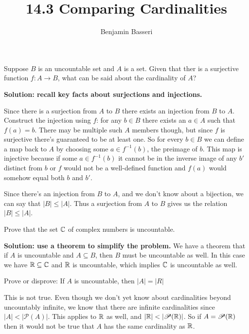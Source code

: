 \documentclass{article}
\title{14.3 Comparing Cardinalities}
\author{Benjamin Basseri}
\begin{document}
\maketitle

\begin{problem}
Suppose $B$ is an uncountable set and $A$ is a set. Given that ther is a surjective function $f: A \to B$, what can be said about the cardinality of $A$?
\end{problem}

\textbf{Solution: recall key facts about surjections and injections.}

Since there is a surjection from $A$ to $B$ there exists an injection from $B$ to $A$. Construct the injection using $f$: for any $b \in B$ there exists an $a \in A$ such that $f(a) = b$. There may be multiple such $A$ members though, but since $f$ is surjective there's guaranteed to be at least one. So for every $b \in B$ we can define a map back to $A$ by choosing some $a \in f^{-1}(b)$, the preimage of $b$. This map is injective because if some $a \in f^{-1}(b)$ it cannot be in the inverse image of any $b'$ distinct from $b$ or $f$ would not be a well-defined function and $f(a)$ would somehow equal both $b$ and $b'$.

Since there's an injection from $B$ to $A$, and we don't know about a bijection, we can say that $|B| \leq |A|$. Thus a surjection from $A$ to $B$ gives us the relation $|B| \leq |A|$.

\begin{problem}
Prove that the set $\mathbb{C}$ of complex numbers is uncountable.
\end{problem}

\textbf{Solution: use a theorem to simplify the problem.} We have a theorem that if $A$ is uncountable and $A \subseteq B$, then $B$ must be uncountable as well. In this case we have $\mathbb{R} \subseteq \mathbb{C}$ and $\mathbb{R}$ is uncountable, which implies $\mathbb{C}$ is uncountable as well.

\begin{problem}
Prove or disprove: If $A$ is uncountable, then $|A| = |R|$
\end{problem}

This is not true. Even though we don't yet know about cardinalities beyond uncountably infinite, we know that there are infinite cardinalities since $|A| < |\mathscr{P}(A)|$. This applies to $\mathbb{R}$ as well, and $|\mathbb{R}| < |\mathscr{P}(\mathbb{R})|$. So if $A = \mathscr{P}(\mathbb{R})$ then it would not be true that $A$ has the same cardinality as $\mathbb{R}$.
\end{document}
